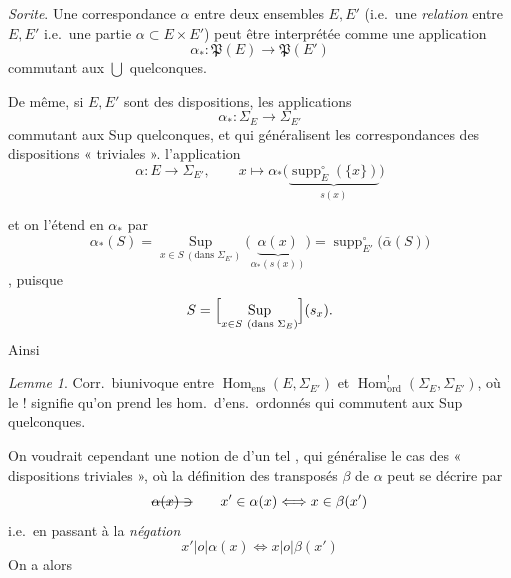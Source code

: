 \documentclass[11pt,a4paper]{article}
\begin{document}
\emph{Sorite}. Une correspondance $\alpha$ entre deux ensembles $E, E'$ (i.e.\ une \emph{relation} entre $E, E'$ i.e.\ une partie $\alpha \subset E \times E'$) peut être interprétée comme une application
\[ \alpha_{*} : \mathfrak{P}(E) \longrightarrow \mathfrak{P}(E') \]
commutant aux $\bigcup$ quelconques.

De même, \struck{\ill{}} si $E, E'$ sont des dispositions,  les applications
\[ \alpha_{*} : \Sigma_E \longrightarrow \Sigma_{E'} \]
commutant aux Sup quelconques, et qui généralisent  les correspondances des dispositions « triviales ».  l'application
\[ \alpha : E \longrightarrow \Sigma_{E'}, \qquad x \longmapsto \alpha_{*}\bigl(\underbrace{\operatorname{supp}^{\circ}_{E}(\{x\})}_{s(x)}\bigr) \]

et on  l'étend en $\alpha_{*}$ par
\[ \alpha_{*}(S) = \mathop{\mathrm{Sup}}\limits_{x \in S\ (\text{dans } \Sigma_{E'})} \bigl(\underbrace{\alpha(x)}_{\alpha_{*}(s(x))}\bigr) = \operatorname{supp}^{\circ}_{E'}\bigl(\bar\alpha(S)\bigr) \]
\emph{}, puisque
\[ S = \Bigl[\mathop{\mathrm{Sup}}\limits_{x \in S\ (\text{dans } \Sigma_E)}\Bigr](s_x). \]
Ainsi

\emph{Lemme 1}. Corr.\ biunivoque entre  $\operatorname{Hom}_{\mathrm{ens}}(E, \Sigma_{E'})$ et $\operatorname{Hom}_{\mathrm{ord}}^{!}(\Sigma_E, \Sigma_{E'})$, où le ! signifie qu'on prend les hom.\ d'ens.\ ordonnés qui \struck{\ill{}} commutent aux Sup quelconques.

On voudrait cependant une notion de  d'un tel , qui généralise le cas des « dispositions triviales », où la définition des transposés $\beta$ de $\alpha$ peut se décrire par
\[ \text{\struck{$\alpha(x) \ni$}}\qquad x' \in \alpha(x) \Longleftrightarrow x \in \beta(x') \]
i.e.\ en passant à la \emph{négation}
\[ x' \mathrel{|o|} \alpha(x) \Longleftrightarrow x \mathrel{|o|} \beta(x') \]
On a alors
\end{document}
